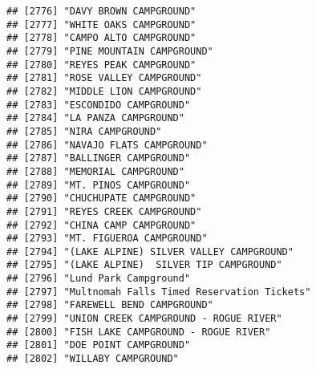 \documentclass[
]{article}
\begin{document}
\begin{verbatim}
## [2776] "DAVY BROWN CAMPGROUND"                                                               
## [2777] "WHITE OAKS CAMPGROUND"                                                               
## [2778] "CAMPO ALTO CAMPGROUND"                                                               
## [2779] "PINE MOUNTAIN CAMPGROUND"                                                            
## [2780] "REYES PEAK CAMPGROUND"                                                               
## [2781] "ROSE VALLEY CAMPGROUND"                                                              
## [2782] "MIDDLE LION CAMPGROUND"                                                              
## [2783] "ESCONDIDO CAMPGROUND"                                                                
## [2784] "LA PANZA CAMPGROUND"                                                                 
## [2785] "NIRA CAMPGROUND"                                                                     
## [2786] "NAVAJO FLATS CAMPGROUND"                                                             
## [2787] "BALLINGER CAMPGROUND"                                                                
## [2788] "MEMORIAL CAMPGROUND"                                                                 
## [2789] "MT. PINOS CAMPGROUND"                                                                
## [2790] "CHUCHUPATE CAMPGROUND"                                                               
## [2791] "REYES CREEK CAMPGROUND"                                                              
## [2792] "CHINA CAMP CAMPGROUND"                                                               
## [2793] "MT. FIGUEROA CAMPGROUND"                                                             
## [2794] "(LAKE ALPINE) SILVER VALLEY CAMPGROUND"                                              
## [2795] "(LAKE ALPINE)  SILVER TIP CAMPGROUND"                                                
## [2796] "Lund Park Campground"                                                                
## [2797] "Multnomah Falls Timed Reservation Tickets"                                           
## [2798] "FAREWELL BEND CAMPGROUND"                                                            
## [2799] "UNION CREEK CAMPGROUND - ROGUE RIVER"                                                
## [2800] "FISH LAKE CAMPGROUND - ROGUE RIVER"                                                  
## [2801] "DOE POINT CAMPGROUND"                                                                
## [2802] "WILLABY CAMPGROUND"                                                                  

\end{verbatim}
\end{document}
